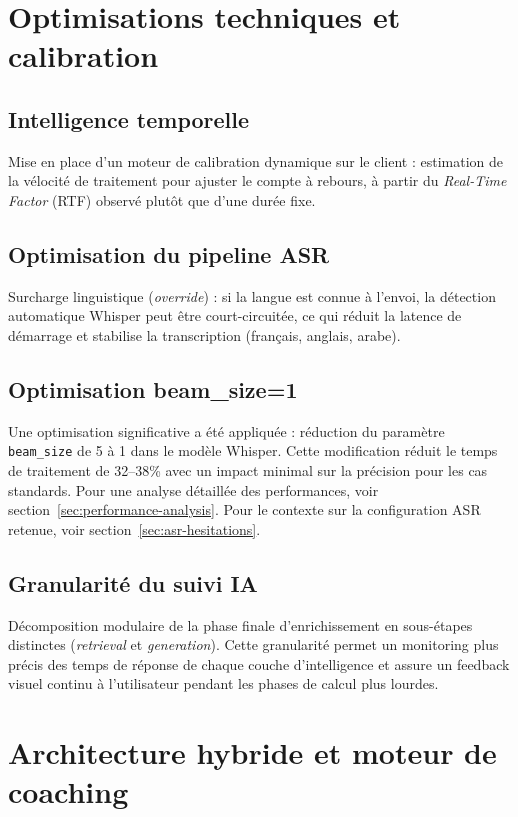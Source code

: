 ﻿\documentclass[12pt,a4paper]{article}
\begin{document}
\section{Optimisations techniques et calibration}

\subsection{Intelligence temporelle}
Mise en place d'un moteur de calibration dynamique sur le client : estimation de la vélocité de traitement pour ajuster le compte à rebours, à partir du \textit{Real-Time Factor} (RTF) observé plutôt que d'une durée fixe.

\subsection{Optimisation du pipeline ASR}
Surcharge linguistique (\textit{override}) : si la langue est connue à l'envoi, la détection automatique Whisper peut être court-circuitée, ce qui réduit la latence de démarrage et stabilise la transcription (français, anglais, arabe).

\subsection{Optimisation beam\_size=1}
Une optimisation significative a été appliquée : réduction du paramètre \texttt{beam\_size} de 5 à 1 dans le modèle Whisper. Cette modification réduit le temps de traitement de 32--38\% avec un impact minimal sur la précision pour les cas standards. Pour une analyse détaillée des performances, voir section~\ref{sec:performance-analysis}. Pour le contexte sur la configuration ASR retenue, voir section~\ref{sec:asr-hesitations}.

\subsection{Granularité du suivi IA}
Décomposition modulaire de la phase finale d'enrichissement en sous-étapes distinctes (\textit{retrieval} et \textit{generation}). Cette granularité permet un monitoring plus précis des temps de réponse de chaque couche d'intelligence et assure un feedback visuel continu à l'utilisateur pendant les phases de calcul plus lourdes.

\section{Architecture hybride et moteur de coaching}
\end{document}
